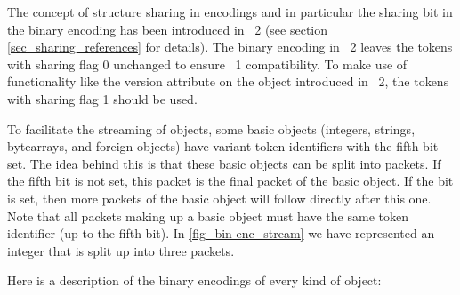 The concept of structure sharing in \OM encodings and in particular the sharing bit in the
binary encoding has been introduced in \OM~2 (see section \ref{sec_sharing_references} for
details). The binary encoding in \OM~2 leaves the tokens with sharing flag 0 unchanged to
ensure \OM~1 compatibility. To make use of functionality like the version attribute on the
\OM object introduced in \OM~2, the tokens with sharing flag 1 should be used.


To facilitate the streaming of \OM objects, some basic objects (integers, strings,
bytearrays, and foreign objects) have variant token identifiers with the fifth bit
set. The idea behind this is that these basic objects can be split into packets. If the
fifth bit is not set, this packet is the final packet of the basic object. If the bit is
set, then more packets of the basic object will follow directly after this one. Note that
all packets making up a basic object must have the same token identifier (up to the fifth
bit). In \ref{fig_bin-enc_stream} we have represented an integer that is split up into
three packets.

Here is a description of the binary encodings of every kind of \OM object:

